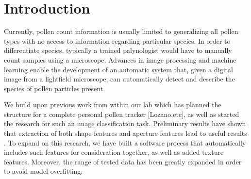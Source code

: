 \section{Introduction}

Currently, pollen count information is usually limited to generalizing all pollen types with no access to information regarding particular species. In order to differentiate species, typically a trained palynologist would have to manually count samples using a microscope. Advances in image processing and machine learning enable the development of an automatic system that, given a digital image from a lightfield microscope, can automatically detect and describe the species of pollen particles present.

We build upon previous work from within our lab which has planned the structure for a complete personal pollen tracker [Lozano,etc], as well as started the research for such an image classification task. Preliminary results have shown that extraction of both shape features and aperture features lead to useful results \cite{Lozano_2014}. To expand on this research, we have built a software process that automatically includes such features for consideration together, as well as added texture features. Moreover, the range of tested data has been greatly expanded in order to avoid model overfitting. 

  
  